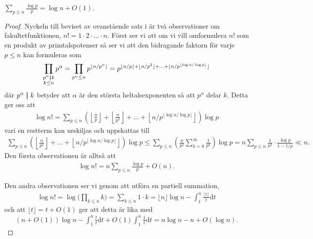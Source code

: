 \cite[Sats 1.4.3]{cojocarumurty}
\begin{theorem} \label{APDX:THM1.4.3}
    $\sum_{p \leq n} \frac{\log p}{p} = \log n + O(1) $.
\end{theorem}
\begin{proof}
Nyckeln till beviset av ovanstående sats i \cite{cojocarumurty} är två observationer om fakultetfunktionen, \(n! = 1 \cdot 2 \cdot ... \cdot n\). Först ser vi att om vi vill omformulera \(n!\) som en produkt av primtalspotenser så ser vi att den bidragande faktorn för varje $p \leq n$ kan formuleras som 
\begin{align*}
    \prod_{\substack{p^\alpha \mid\!\mid k \\ k \leq n}} p^\alpha = \prod_{p^\alpha \leq n} p^{\lfloor n/p^{\alpha} \rfloor} = p^{\lfloor n/p \rfloor + \lfloor n/p^2 \rfloor + ... + \lfloor n / p^{\lfloor \log n / \log p \rfloor} \rfloor}
\end{align*}
där \(p^\alpha \mid\!\mid k\) betyder att \(\alpha\) är den största heltalsexponenten så att $p^\alpha$ delar $k$. Detta ger oss att 
\begin{align*}
    \log n! = %
    \sum_{p \leq n} \left(\left\lfloor\frac{n}{p} \right\rfloor + \left\lfloor \frac{n}{p^2} \right\rfloor + ... + \left\lfloor n / p^{\lfloor \log n / \log p \rfloor} \right\rfloor\right) \log p
\end{align*}
vari en restterm kan urskiljas och uppskattas till
\begin{align*}
    \sum_{p \leq n} \left(\left\lfloor \frac{n}{p^2} \right\rfloor + ... + \left\lfloor n / p^{\lfloor \log n / \log p \rfloor} \right\rfloor\right) \log p \leq
    \sum_{p \leq n} \left( \frac{n}{p^2}  \sum_{k=0}^\infty \frac{1}{p^k} \right) \log p
    = n \sum_{p \leq n} \frac{1}{p^2} \cdot \frac{\log p}{1 - 1/p} \ll n.
\end{align*} %
Den första observationen är alltså att
\begin{align} \label{APDX:obser1Thm1.4.3}
    \log n! = n \sum_{p \leq n} \frac{\log p}{p} + O(n).
\end{align}

Den andra observationen ser vi genom att utföra en partiell summation,
\begin{align*}
    \log n! = \log \Big(\prod_{k \leq n} k\Big) = \sum_{k \leq n} 1 \cdot k = 
    \lfloor n \rfloor \log n - \int_1^n \frac{\lfloor t \rfloor}{t} \text{d} t 
\end{align*}
och att \(\lfloor t \rfloor = t + O(1)\) ger att detta är lika med
\begin{align} \label{APDX:obser2Thm1.4.3}
    (n + O(1)) \log n - \int_1^n \frac{t}{t} \text{d} t + O(1) \int_1^n \frac{1}{t} \text{d} t  = n \log n - n + O(\log n).
\end{align}


\end{proof}
